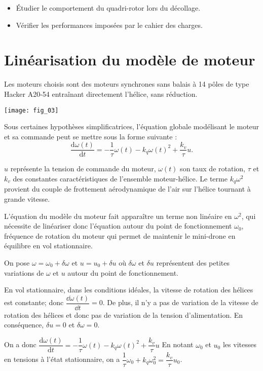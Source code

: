 \fi
\begin{obj}
\begin{itemize}
\item Étudier le comportement du quadri-rotor lors du décollage.
\item Vérifier les performances imposées par le cahier des charges.
\end{itemize}
\end{obj}

\section*{Linéarisation du modèle de moteur}
\ifprof
\else

Les moteurs choisis sont des moteurs synchrones sans balais à 14 pôles de type Hacker A20-54 entraînant
directement l'hélice, sans réduction.

\begin{marginfigure}
\centering
\texttt{[image: fig\_03]}
\end{marginfigure}

Sous certaines hypothèses simplificatrices, l'équation globale modélisant le moteur et sa commande peut se
mettre sous la forme suivante :
$$
\dfrac{\text{d}\omega(t)}{\text{d}t}=-\dfrac{1}{\tau}\omega(t) -k_q\omega(t)^2 + \dfrac{k_v}{\tau}u.
$$

$u$ représente la tension de commande du moteur, $\omega(t)$ son taux de rotation, $\tau$ et $k_v$ des constantes caractéristiques de l'ensemble moteur-hélice. Le terme $k_q\omega^2$ provient du couple de frottement aérodynamique de l'air sur l'hélice tournant à grande vitesse.

L'équation du modèle du moteur fait apparaître un terme non linéaire en $\omega^2$, qui nécessite de linéariser
donc l'équation autour du point de fonctionnement $\omega_0$, fréquence de rotation du moteur qui permet de
maintenir le mini-drone en équilibre en vol stationnaire.

On pose $\omega=\omega_0+\delta \omega$ et $u=u_0+\delta u$ où $\delta\omega$ et $\delta u$ représentent des petites variations de $\omega$ et $u$ autour du point de fonctionnement.
\fi

\ifprof
\begin{corrige}
En vol stationnaire, dans les conditions idéales, la vitesse de rotation des hélices est constante; donc $\dfrac{\dd \omega(t)}{\dd t} = 0$. De plus, il n'y a pas de variation de la vitesse de rotation des hélices et donc pas de variation de la tension d'alimentation. En conséquence, $\delta u =0$ et $\delta \omega = 0$.

On a donc 
$
\dfrac{\text{d}\omega(t)}{\text{d}t}=-\dfrac{1}{\tau}\omega(t) -k_q\omega(t)^2 + \dfrac{k_v}{\tau}u $ 
En notant $\omega_0$ et $u_0$ les vitesses en tensions à l'état stationnaire, on a 
$\dfrac{1}{\tau}\omega_0 +k_q\omega_0^2 = \dfrac{k_v}{\tau}u_0$.

\end{corrige}
\else
\fi

